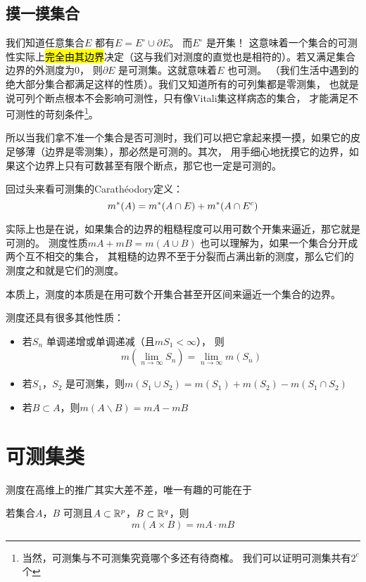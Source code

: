 \subsection{摸一摸集合}
我们知道任意集合\(E\) 都有\(E=E^{\circ} \cup \partial E\)。
而\(E^{\circ}\) 是开集！
这意味着一个集合的可测性实际上\hl{完全由其边界}决定（这与我们对测度的直觉也是相符的）。若又满足集合边界的外测度为0，
则\(\partial E\) 是可测集。这就意味着\(E\) 也可测。
（我们生活中遇到的绝大部分集合都满足这样的性质）。我们又知道所有的可列集都是零测集，
也就是说可列个断点根本不会影响可测性，只有像Vitali集这样病态的集合，
才能满足不可测性的苛刻条件\footnote{当然，可测集与不可测集究竟哪个多还有待商榷。
我们可以证明可测集共有\(2^{c}\) 个}。

所以当我们拿不准一个集合是否可测时，我们可以把它拿起来摸一摸，如果它的皮足够薄（边界是零测集），那必然是可测的。其次，
用手细心地抚摸它的边界，如果这个边界上只有可数甚至有限个断点，那它也一定是可测的。

回过头来看可测集的Carathéodory定义： \[
    m^{*}(A)=m^{*}(A\cap E)+m^{*}(A\cap E^{c})
\]

实际上也是在说，如果集合的边界的粗糙程度可以用可数个开集来逼近，那它就是可测的。
测度性质\(mA+mB=m(A\cup B)\) 也可以理解为，如果一个集合分开成两个互不相交的集合，
其粗糙的边界不至于分裂而占满出新的测度，那么它们的测度之和就是它们的测度。

本质上，测度的本质是在用可数个开集合甚至开区间来逼近一个集合的边界。

测度还具有很多其他性质：
\begin{itemize}
    \item 若\({S_{n}}\) 单调递增或单调递减（且\(mS_{1}<\infty\)），
        则\[m(\lim_{n \to \infty} S_{n})=\lim_{n\to
        \infty} m(S_{n})\]
    \item 若\(S_{1}\)，\(S_{2}\) 是可测集，则\(
        m(S_{1}\cup S_{2})=m(S_{1})+m(S_{2})-m(S_{1}\cap S_{2})\)
    \item 若\(B \subset A\)，则\(m(A \backslash B)=mA-mB\)
\end{itemize}
\section{可测集类}

测度在高维上的推广其实大差不差，唯一有趣的可能在于

\begin{theorem}
    若集合\(A\)，\(B\) 可测且\(A\subset \mathbb{R}^{p}\)，\(B \subset \mathbb{R}^{q} \)，则\[
        m(A\times B)=mA \cdot mB
    \]
\end{theorem}

